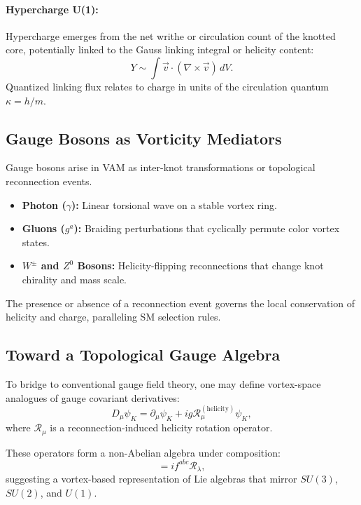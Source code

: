 \paragraph{Hypercharge U(1):} Hypercharge emerges from the net writhe or circulation count of the knotted core, potentially linked to the Gauss linking integral or helicity content:
\begin{equation}
    Y \sim \int \vec{v} \cdot (\nabla \times \vec{v}) \, dV.
\end{equation}
Quantized linking flux relates to charge in units of the circulation quantum $\kappa = h/m$.

\subsection{Gauge Bosons as Vorticity Mediators}

Gauge bosons arise in VAM as inter-knot transformations or topological reconnection events.

\begin{itemize}
    \item \textbf{Photon ($\gamma$):} Linear torsional wave on a stable vortex ring.
    \item \textbf{Gluons ($g^a$):} Braiding perturbations that cyclically permute color vortex states.
    \item \textbf{$W^\pm$ and $Z^0$ Bosons:} Helicity-flipping reconnections that change knot chirality and mass scale.
\end{itemize}

The presence or absence of a reconnection event governs the local conservation of helicity and charge, paralleling SM selection rules.

\subsection{Toward a Topological Gauge Algebra}

To bridge to conventional gauge field theory, one may define vortex-space analogues of gauge covariant derivatives:
\begin{equation}
    D_\mu \psi_K = \partial_\mu \psi_K + i g \mathcal{R}_\mu^{(\text{helicity})} \psi_K,
\end{equation}
where $\mathcal{R}_\mu$ is a reconnection-induced helicity rotation operator.

These operators form a non-Abelian algebra under composition:
\begin{equation}
[\mathcal{R}_\mu, \mathcal{R}_\nu] = i f^{abc} \mathcal{R}_\lambda,
\end{equation}
suggesting a vortex-based representation of Lie algebras that mirror $SU(3)$, $SU(2)$, and $U(1)$.